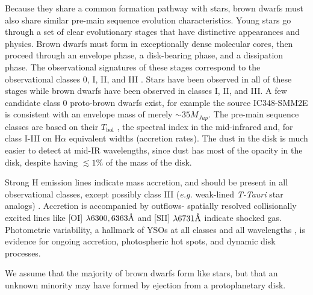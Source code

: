 Because they share a common formation pathway with stars, brown dwarfs must also share similar pre-main sequence evolution characteristics.  Young stars go through a set of clear evolutionary stages that have distinctive appearances and physics.  Brown dwarfs must form in exceptionally dense molecular cores, then proceed through an envelope phase, a disk-bearing phase, and a dissipation phase.  The observational signatures of these stages correspond to the observational classes 0, I, II, and III \citep{1987ApJ...312..788A}.  Stars have been observed in all of these stages \citep{2014prpl.conf..195D} while brown dwarfs have been observed in classes I, II, and III.  A few candidate class 0 proto-brown dwarfs exist\citep{2012Sci...337...69A,2014A&A...564A..32P,2014MNRAS.444..833P}, for example the source IC348-SMM2E is consistent with an envelope mass of merely $\sim35 M_{Jup}$.  The pre-main sequence classes are based on their $T_{\mathrm{bol}}$ \citep{1993ApJ...413L..47M}, the spectral index in the mid-infrared \citep{1984ApJ...287..610L} and, for class I-III on H$\alpha$ equivalent widths (accretion rates).  The dust in the disk is much easier to detect at mid-IR wavelengths, since dust has most of the opacity in the disk, despite having $\lesssim1\%$ of the mass of the disk.  

Strong H emission lines indicate mass accretion, and should be present in all observational classes, except possibly class III (\emph{e.g.} weak-lined \emph{T-Tauri} star analogs) \citep{2009apsf.book.....H}.  Accretion is accompanied by outflows- spatially resolved collisionally excited lines like [OI] $\lambda 6300, 6363 \mbox{\normalfont\AA}$ and [SII] $\lambda 6731 \mbox{\normalfont\AA}$ \citep{2005Natur.435..652W} indicate shocked gas.  Photometric variability, a hallmark of YSOs at all classes and all wavelengths \citep{2014AJ....148...92R,2014AJ....147...82C}, is evidence for ongoing accretion, photospheric hot spots, and dynamic disk processes.

We assume that the majority of brown dwarfs form like stars, but that an unknown minority may have formed by ejection from a protoplanetary disk.


